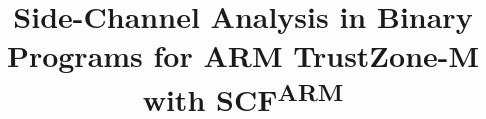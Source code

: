 \documentclass[compsoc, conference, a4paper, 10pt, times]{IEEEtran}
\newcommand{\tool}[0]{SCF\textsuperscript{ARM}{}}
\begin{document}
\title{Side-Channel Analysis in Binary Programs for ARM TrustZone-M with
\tool{}}


\iffalse
\author{\IEEEauthorblockN{1\textsuperscript{st} Given Names Surname}
\IEEEauthorblockA{\textit{Affiliation} \\
City, Country \\
email address or website URL}
\and
\IEEEauthorblockN{2\textsuperscript{nd} Given Names Surname}
\IEEEauthorblockA{\textit{Affiliation} \\
City, Country \\
email address or website URL}
\and
\IEEEauthorblockN{3\textsuperscript{rd} Given Names Surname}
\IEEEauthorblockA{\textit{Affiliation} \\
City, Country \\
email address or website URL}
}
\fi

\maketitle

\begin{abstract}
  
\end{abstract}














\end{document}
